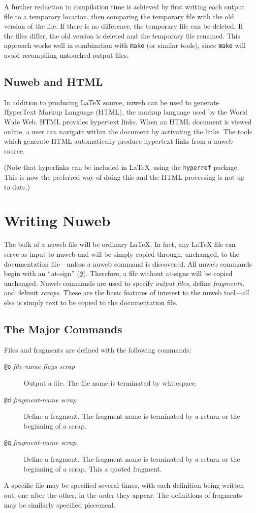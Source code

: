 \documentclass[a4paper]{report}
\begin{document}
A further reduction in compilation time is achieved by first
writing each output file to a temporary location, then comparing the
temporary file with the old version of the file. If there is no
difference, the temporary file can be deleted. If the files differ,
the old version is deleted and the temporary file renamed. This
approach works well in combination with \verb|make| (or similar tools),
since \verb|make| will avoid recompiling untouched output files.

\subsection{Nuweb and HTML}

In addition to producing {\LaTeX} source, nuweb can be used to
generate HyperText Markup Language (HTML), the markup language used by
the World Wide Web.  HTML provides hypertext links.  When an HTML
document is viewed online, a user can navigate within the document by
activating the links.  The tools which generate HTML automatically
produce hypertext links from a nuweb source.

(Note that hyperlinks can be included in \LaTeX\ using the
\verb|hyperref| package. This is now the preferred way of doing
this and the HTML processing is not up to date.)

\section{Writing Nuweb}

The bulk of a nuweb file will be ordinary \LaTeX\@. In fact, any
{\LaTeX} file can serve as input to nuweb and will be simply copied
through, unchanged, to the documentation file---unless a nuweb command
is discovered. All nuweb commands begin with an ``at-sign''
(\verb|@|).  Therefore, a file without at-signs will be copied
unchanged.  Nuweb commands are used to specify {\em output files,}
define {\em fragments,} and delimit {\em scraps}. These are the basic
features of interest to the nuweb tool---all else is simply text to be
copied to the documentation file.

\subsection{The Major Commands}

Files and fragments are defined with the following commands:
\begin{description}
\item[{\tt @o} {\em file-name flags scrap\/}] Output a file. The file
  name is terminated by whitespace.
\item[{\tt @d} {\em fragment-name scrap\/}] Define a fragment. The
  fragment name is terminated by a return or the beginning of a scrap.
\item[{\tt @q} {\em fragment-name scrap\/}] Define a fragment. The
  fragment name is terminated by a return or the beginning of a scrap.
  This a quoted fragment.
\end{description}
A specific file may be specified several times, with each definition
being written out, one after the other, in the order they appear.
The definitions of fragments may be similarly specified piecemeal.
\end{document}
